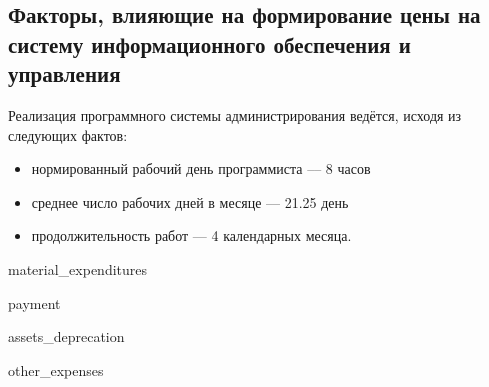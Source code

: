 \subsection{Факторы, влияющие на формирование цены на систему информационного обеспечения и управления}
Реализация программного системы администрирования ведётся, исходя из следующих фактов:
\begin{itemize}
\item нормированный рабочий день программиста --– 8 часов
\item среднее число рабочих дней в месяце –-- 21.25 день
\item продолжительность работ --- 4 календарных месяца.
\end{itemize}

{material_expenditures}

{payment}

{assets_deprecation}

{other_expenses}
